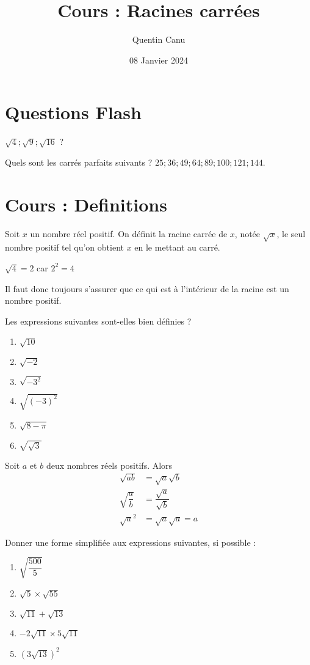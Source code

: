 \documentclass{article}
\title{Cours : Racines carrées}
\date{08 Janvier 2024}
\author{Quentin Canu}
\begin{document}
\maketitle

\section{Questions Flash}
$\sqrt{4}; \sqrt{9}; \sqrt{16}$ ?

Quels sont les carrés parfaits suivants ? $25; 36; 49; 64; 89; 100; 121; 144$.
\section{Cours : Definitions}
\begin{definition}
Soit $x$ un nombre réel positif. On définit la racine carrée de $x$, notée $\sqrt{x}$, le seul nombre positif tel qu'on obtient $x$ en le mettant au carré.    
\end{definition}
\begin{example}
$\sqrt{4} = 2$ car $2^2 = 4$
\end{example}
\begin{remark}
Il faut donc toujours s'assurer que ce qui est à l'intérieur de la racine est un nombre positif.
\end{remark}
\begin{example}
Les expressions suivantes sont-elles bien définies ?
\begin{enumerate}
\item $\sqrt{10}$
\item $\sqrt{-2}$
\item $\sqrt{-3^2}$
\item $\sqrt{(-3)^2}$
\item $\sqrt{8 - \pi}$
\item $\sqrt{\sqrt{3}}$ 
\end{enumerate}
\end{example}
\begin{proposition}
Soit $a$ et $b$ deux nombres réels positifs. Alors
\begin{align*}
\sqrt{ab} &= \sqrt{a}\sqrt{b}\\
\sqrt{\dfrac{a}{b}} &= \dfrac{\sqrt{a}}{\sqrt{b}}\\
\sqrt{a}^2 &= \sqrt{a}\sqrt{a} = a
\end{align*}
\end{proposition}
\begin{example}
Donner une forme simplifiée aux expressions suivantes, si possible :
\begin{enumerate}
\item $\sqrt{\dfrac{500}{5}}$
\item $\sqrt{5} \times \sqrt{55}$
\item $\sqrt{11} + \sqrt{13}$
\item $-2\sqrt{11} \times 5\sqrt{11}$
\item $(3\sqrt{13})^2$
\end{enumerate}
\end{example}
\end{document}

